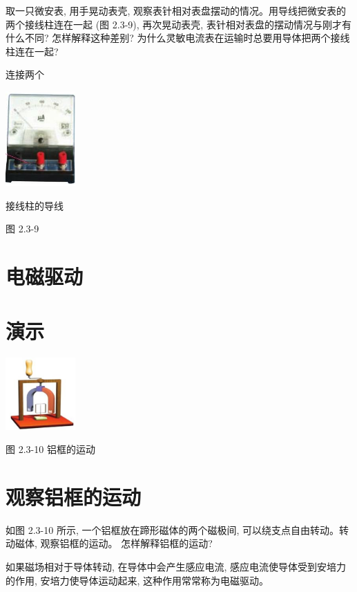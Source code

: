 \documentclass[10pt]{article}
\begin{document}
取一只微安表, 用手晃动表壳, 观察表针相对表盘摆动的情况。用导线把微安表的两个接线柱连在一起 (图 2.3-9), 再次晃动表壳, 表针相对表盘的摆动情况与刚才有什么不同? 怎样解释这种差别? 为什么灵敏电流表在运输时总要用导体把两个接线柱连在一起?

连接两个

\begin{center}
\includegraphics[max width=0.2\textwidth]{images/01910e72-c5b7-7ed5-a6d4-fb3a5faefc32_43_197660.jpg}
\end{center}

接线柱的导线

图 2.3-9

\section*{电磁驱动}

\section*{演示}

\begin{center}
\includegraphics[max width=0.2\textwidth]{images/01910e72-c5b7-7ed5-a6d4-fb3a5faefc32_43_358698.jpg}
\end{center}

图 2.3-10 铝框的运动

\section*{观察铝框的运动}

如图 2.3-10 所示, 一个铝框放在蹄形磁体的两个磁极间, 可以绕支点自由转动。转动磁体, 观察铝框的运动。 怎样解释铝框的运动?

如果磁场相对于导体转动, 在导体中会产生感应电流, 感应电流使导体受到安培力的作用, 安培力使导体运动起来, 这种作用常常称为电磁驱动。
\end{document}

